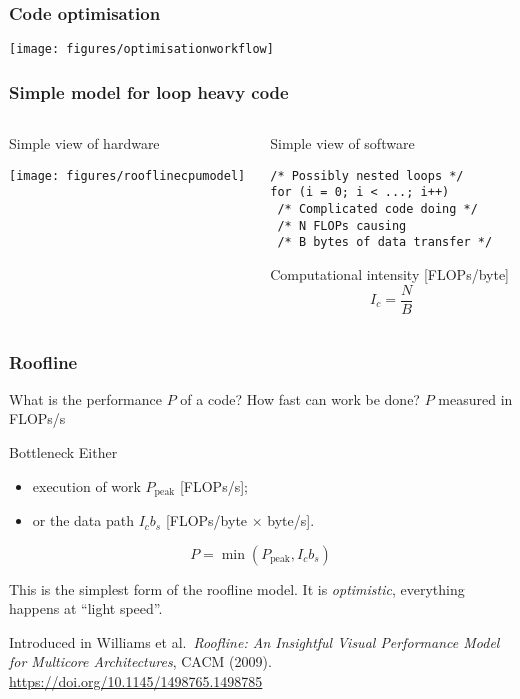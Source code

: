 \documentclass[presentation,aspectratio=43,10pt]{beamer}
\begin{document}
\begin{frame}
  \frametitle{Code optimisation}
  \begin{center}
    \texttt{[image: figures/optimisationworkflow]}
  \end{center}
\end{frame}

\begin{frame}[fragile]
  \frametitle{Simple model for loop heavy code}
  \begin{columns}
    \begin{column}{0.4\textwidth}
      Simple view of hardware
      \begin{center}
        \texttt{[image: figures/rooflinecpumodel]}
      \end{center}
    \end{column}
    \begin{column}{0.5\textwidth}
      Simple view of software

\begin{verbatim}
/* Possibly nested loops */
for (i = 0; i < ...; i++)
 /* Complicated code doing */
 /* N FLOPs causing
 /* B bytes of data transfer */
\end{verbatim}

      Computational intensity [FLOPs/byte]
      \begin{equation*}
        I_c = \frac{N}{B}
      \end{equation*}
    \end{column}
  \end{columns}
\end{frame}

\begin{frame}
  \frametitle{Roofline}
  \begin{challenge}{What is the performance $P$ of a code?}
    How fast can work be done? $P$ measured in FLOPs/s
  \end{challenge}
  \begin{answer}{Bottleneck}
    Either
    \begin{itemize}
    \item execution of work $P_{\text{peak}}$ [FLOPs/s];
    \item or the data path $I_c b_s$ [FLOPs/byte $\times$ byte/s].
    \end{itemize}
    \begin{equation*}
      P = \min{(P_\text{peak}, I_c b_s)}
    \end{equation*}
  \end{answer}

  This is the simplest form of the roofline model. It is
  \emph{optimistic}, everything happens at ``light speed''.

  Introduced in Williams et al.~\emph{Roofline: An Insightful Visual
    Performance Model for Multicore Architectures}, CACM (2009).
  \url{https://doi.org/10.1145/1498765.1498785}
\end{frame}
\end{document}
